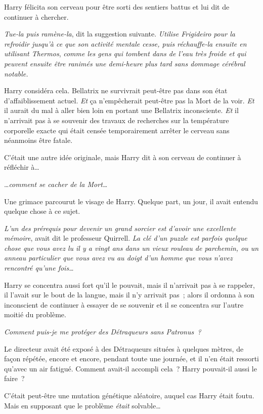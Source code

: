Harry félicita son cerveau pour être sorti des sentiers battus et lui dit de continuer à chercher.

\emph{Tue-la puis ramène-la}, dit la suggestion suivante.
\emph{Utilise Frigideiro} \emph{pour la refroidir jusqu'à ce que son activité mentale cesse, puis réchauffe-la ensuite en utilisant Thermos}, \emph{comme les gens qui tombent dans de l'eau très froide et qui peuvent ensuite être ranimés une demi-heure plus tard sans dommage cérébral notable.}

Harry considéra cela.
Bellatrix ne survivrait peut-être pas dans son état d'affaiblissement actuel.
\emph{Et} ça n'empêcherait peut-être pas la Mort de la voir.
\emph{Et} il aurait du mal à aller bien loin en portant une Bellatrix inconsciente.
\emph{Et} il n'arrivait pas à se souvenir des travaux de recherches sur la température corporelle exacte qui était censée temporairement arrêter le cerveau sans néanmoins être fatale.

C'était une autre idée originale, mais Harry dit à son cerveau de continuer à réfléchir à…

…\emph{comment se cacher de la Mort…}

Une grimace parcourut le visage de Harry.
Quelque part, un jour, il avait entendu quelque chose à ce sujet.

\emph{L'un des prérequis pour devenir un grand sorcier est d'avoir une excellente mémoire}, avait dit le professeur Quirrell.
\emph{La clé d'un puzzle est parfois quelque chose que vous avez lu il y a vingt ans dans un vieux rouleau de parchemin, ou un anneau particulier que vous avez vu au doigt d'un homme que vous n'avez rencontré qu'une fois…}

Harry se concentra aussi fort qu'il le pouvait, mais il n'arrivait pas à se rappeler, il l'avait sur le bout de la langue, mais il n'y arrivait pas~; alors il ordonna à son inconscient de continuer à essayer de se souvenir et il se concentra sur l'autre moitié du problème.

\emph{Comment puis-je me protéger des Détraqueurs sans Patronus~?}

Le directeur avait été exposé à des Détraqueurs situées à quelques mètres, de façon répétée, encore et encore, pendant toute une journée, et il n'en était ressorti qu'avec un air fatigué.
Comment avait-il accompli cela~?
Harry pouvait-il aussi le faire~?

C'était peut-être une mutation génétique aléatoire, auquel cas Harry était foutu.
Mais en supposant que le problème \emph{était} solvable…

